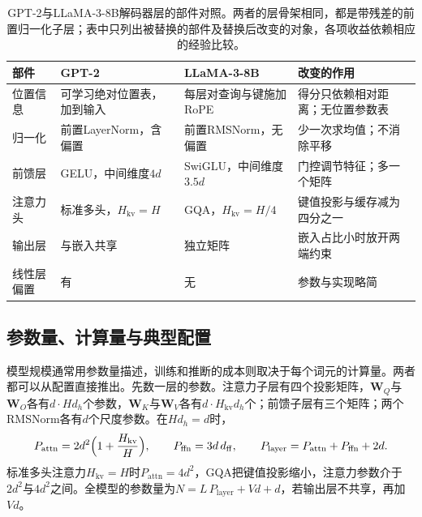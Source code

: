 \begin{table}[htbp]
  \begin{tabularx}{\linewidth}{@{}p{24mm}p{40mm}p{40mm}X@{}}
    \toprule
    部件 & GPT-2 & LLaMA-3-8B & 改变的作用\\
    \midrule
    位置信息 & 可学习绝对位置表，加到输入 & 每层对查询与键施加RoPE & 得分只依赖相对距离；无位置参数表\\
    归一化 & 前置LayerNorm，含偏置 & 前置RMSNorm，无偏置 & 少一次求均值；不消除平移\\
    前馈层 & GELU，中间维度$4d$ & SwiGLU，中间维度$3.5d$ & 门控调节特征；多一个矩阵\\
    注意力头 & 标准多头，$H_{\mathrm{kv}}=H$ & GQA，$H_{\mathrm{kv}}=H/4$ & 键值投影与缓存减为四分之一\\
    输出层 & 与嵌入共享 & 独立矩阵 & 嵌入占比小时放开两端约束\\
    线性层偏置 & 有 & 无 & 参数与实现略简\\
    \bottomrule
  \end{tabularx}
  \caption{GPT-2与LLaMA-3-8B解码器层的部件对照。两者的层骨架相同，都是带残差的前置归一化子层；表中只列出被替换的部件及替换后改变的对象，各项收益依赖相应的经验比较。}
  \label{tab:nlp-llm-decoder-choices}
\end{table}

\subsection{参数量、计算量与典型配置}
\label{sec:nlp-llm-decoder-cost}

模型规模通常用参数量描述，训练和推断的成本则取决于每个词元的计算量。两者都可以从配置直接推出。先数一层的参数。注意力子层有四个投影矩阵，$\bm W_Q$与$\bm W_O$各有$d\cdot Hd_h$个参数，$\bm W_K$与$\bm W_V$各有$d\cdot H_{\mathrm{kv}}d_h$个；前馈子层有三个矩阵；两个RMSNorm各有$d$个尺度参数。在$Hd_h=d$时，
\begin{equation}
  P_{\mathrm{attn}}=2d^2\Bigl(1+\frac{H_{\mathrm{kv}}}{H}\Bigr),\qquad
  P_{\mathrm{ffn}}=3d\,d_{\mathrm{ff}},\qquad
  P_{\mathrm{layer}}=P_{\mathrm{attn}}+P_{\mathrm{ffn}}+2d.
  \label{eq:nlp-llm-layer-params}
\end{equation}
标准多头注意力$H_{\mathrm{kv}}=H$时$P_{\mathrm{attn}}=4d^2$，GQA把键值投影缩小，注意力参数介于$2d^2$与$4d^2$之间。全模型的参数量为$N=L\,P_{\mathrm{layer}}+Vd+d$，若输出层不共享，再加$Vd$。

